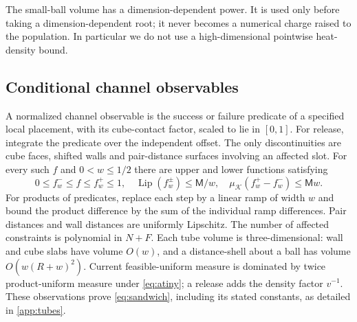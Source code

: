 \documentclass[11pt]{article}
\numberwithin{equation}{section}
\theoremstyle{definition}
\theoremstyle{remark}\newtheorem{remark}[theorem]{Remark}
\newcommand{\Lip}{\operatorname{Lip}}
\newcommand{\K}{\mathcal K}
\begin{document}
The small-ball volume has a dimension-dependent power. It is used only
before taking a dimension-dependent root; it never becomes a numerical
charge raised to the population. In particular we do not use a
high-dimensional pointwise heat-density bound.

\subsection{Conditional channel observables}

A normalized channel observable is the success or failure predicate of a
specified local placement, with its cube-contact factor, scaled to lie in
$[0,1]$. For release, integrate the predicate over the independent offset.
The only discontinuities are cube faces, shifted walls and pair-distance
surfaces involving an affected slot. For every such $f$ and $0<w\le1/2$
there are upper and lower functions satisfying
\begin{equation}\label{eq:sandwich}
 0\le f_w^-\le f\le f_w^+\le1,\quad
 \Lip(f_w^\pm)\le\mathsf M/w,\quad
 \mu_\K(f_w^+-f_w^-)\le\mathsf M w.
\end{equation}
For products of predicates, replace each step by a linear ramp of width
$w$ and bound the product difference by the sum of the individual ramp
differences. Pair distances and wall distances are uniformly Lipschitz.
The number of affected constraints is polynomial in $N+F$.
Each tube volume is three-dimensional: wall and cube slabs have volume
$O(w)$, and a distance-shell about a ball has volume
$O(w(R+w)^2)$. Current feasible-uniform measure is dominated by twice
product-uniform measure under \eqref{eq:atiny}; a release adds the density
factor $v^{-1}$. These observations prove \eqref{eq:sandwich}, including
its stated constants, as detailed in \cref{app:tubes}.
\end{document}

